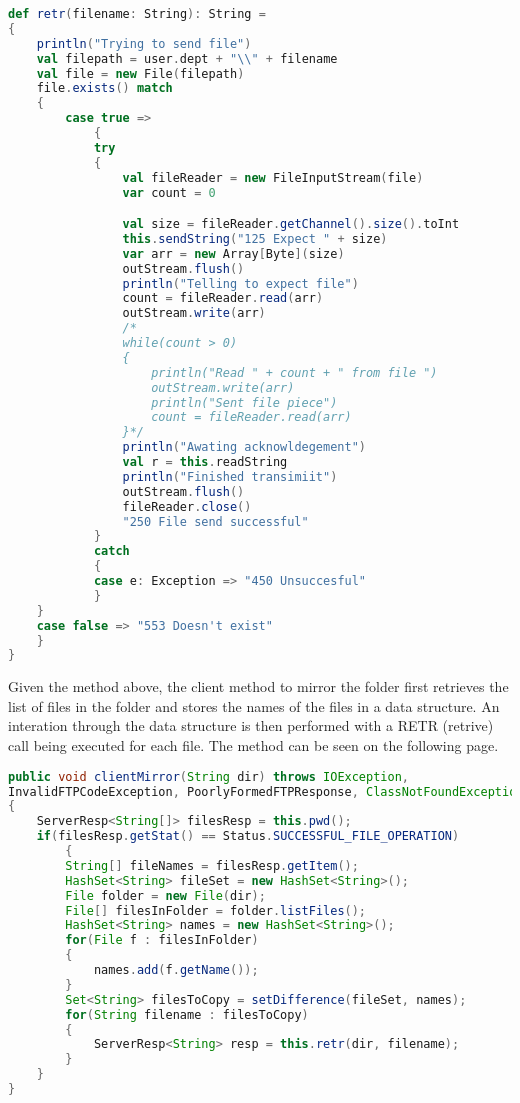 \begin{lstlisting}[language=Scala, caption=File rename operation, showstringspaces=false, tabsize=2]
def retr(filename: String): String =
{
	println("Trying to send file")
	val filepath = user.dept + "\\" + filename
	val file = new File(filepath)
	file.exists() match
	{
		case true =>
			{
			try
			{
				val fileReader = new FileInputStream(file)
				var count = 0

				val size = fileReader.getChannel().size().toInt
				this.sendString("125 Expect " + size)
				var arr = new Array[Byte](size)
				outStream.flush()
				println("Telling to expect file")
				count = fileReader.read(arr)
				outStream.write(arr)
				/*
				while(count > 0)
				{
					println("Read " + count + " from file ")
					outStream.write(arr)
					println("Sent file piece")
					count = fileReader.read(arr)
				}*/
				println("Awating acknowldegement")
				val r = this.readString
				println("Finished transimiit")
				outStream.flush()
				fileReader.close()
				"250 File send successful"
			}
			catch
			{
			case e: Exception => "450 Unsuccesful"
			}
	}
	case false => "553 Doesn't exist"
	}
}

\end{lstlisting}

Given the method above, the client method to mirror the folder first retrieves the list of files in the folder and stores the names of the files
in a data structure. An interation through the data structure is then performed with a RETR (retrive) call being executed for each file. The method can be seen on the following page.\newpage

\begin{lstlisting}[language=Java, caption=Folder Mirroring, showstringspaces=false, tabsize=2]
public void clientMirror(String dir) throws IOException,
InvalidFTPCodeException, PoorlyFormedFTPResponse, ClassNotFoundException
{
	ServerResp<String[]> filesResp = this.pwd();
	if(filesResp.getStat() == Status.SUCCESSFUL_FILE_OPERATION)
		{
		String[] fileNames = filesResp.getItem();
		HashSet<String> fileSet = new HashSet<String>();
		File folder = new File(dir);
		File[] filesInFolder = folder.listFiles();
		HashSet<String> names = new HashSet<String>();
		for(File f : filesInFolder)
		{
			names.add(f.getName());
		}
		Set<String> filesToCopy = setDifference(fileSet, names);
		for(String filename : filesToCopy)
		{
			ServerResp<String> resp = this.retr(dir, filename);
		}
	}
}
\end{lstlisting}
